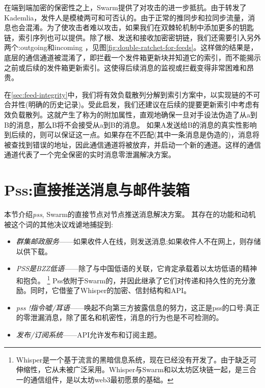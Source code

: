 在端到端加密的保密性之上，Swarm提供了对攻击的进一步抵抗。由于转发了Kademlia，发件人是模棱两可和可否认的。由于正常的推同步和拉同步流量，消息也会混淆。为了使攻击者难以攻击，如果我们在双棘轮机制中添加更多的钥匙链，索引序列也可以提供。除了根、发送和接收加密密钥链，我们还需要引入另外两个:outgoing和incoming ，见图\ref{fig:double-ratchet-for-feeds}。这样做的结果是，底层的通信通道被混淆了，即拦截一个发件箱更新块并知道它的索引，而不能揭示之前或后续的发件箱更新索引。这使得后续消息的监视或拦截变得非常困难和昂贵。

在\ref{sec:feed-integrity}中，我们将有效负载散列分解到索引方案中，以实现链的不可合并性(明确的历史记录)。受此启发，我们还建议在后续的提要更新索引中考虑有效负载散列。这就产生了称为的附加属性，直观地确保一旦对手设法伪造了从a到B的消息，那么B将不会接受从a到B的消息。
如果A发送给B的消息的真实性影响到后续的，则可以保证这一点。如果存在不匹配(其中一条消息是伪造的)，消息将被查找到错误的地址，因此通信通道将被放弃，并启动一个新的通道。这样的通信通道代表了一个完全保密的实时消息零泄漏解决方案。




\section{Pss:直接推送消息与邮件装箱\statusgreen}\label{sec:pss}

\green{}

本节介绍\emph{pss}, Swarm的直接节点对节点推送消息解决方案。 
其存在的功能和动机被这个词的其他决议戏谑地捕捉到:

\begin{itemize}
\item \emph{群集邮政服务}——如果收件人在线，则发送消息;如果收件人不在网上，则存储以供下载。
\item \emph{PSS是BZZ低语}——除了与中国低语的关联，它肯定承载着以太坊低语的精神和抱负。%
%
\footnote{Whisper是一个基于流言的黑暗信息系统，现在已经没有开发了。由于缺乏可伸缩性，它从未被广泛采用。Whisper与Swarm和以太坊区块链一起，是三合一的通信组件，是以太坊web3最初愿景的基础。}
%
Pss依附于Swarm的，并因此继承了它们对传递和持久性的充分激励。同时，它借鉴了Whisper的加密、信封结构和API。
\item \emph{pss !指令嘘/耳语}——唤起不向第三方披露信息的努力，这正是pss的口号:真正的零泄漏消息，除了匿名和机密性，消息的行为也是不可检测的。
\item  \emph{发布/订阅系统}——API允许发布和订阅主题。
\end{itemize}

